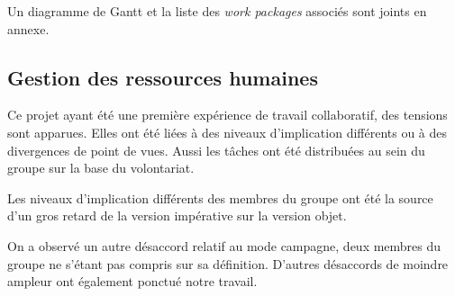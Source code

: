 	Un diagramme de Gantt et la liste des {\em work packages} associés sont joints en annexe.
	
    
\subsection{Gestion des ressources humaines}
	Ce projet ayant été une première expérience de travail collaboratif, des tensions sont apparues. Elles ont été liées à des niveaux d'implication différents ou à des divergences de point de vues. Aussi les tâches ont été distribuées au sein du groupe sur la base du volontariat.
	
	Les niveaux d'implication différents des membres du groupe ont été la source d'un gros retard de la version impérative sur la version objet. 

	On a observé un autre désaccord relatif au mode campagne, deux membres du groupe ne s'étant pas compris sur sa définition. D'autres désaccords de moindre ampleur ont également ponctué notre travail.